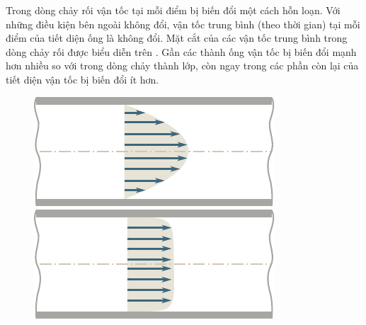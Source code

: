 Trong dòng chảy rối vận tốc tại mỗi điểm bị biến đổi một cách hỗn loạn. Với những điều kiện bên ngoài không đổi, vận tốc trung bình (theo thời gian) tại mỗi điểm của tiết diện ống là không đổi. Mặt cắt của các vận tốc trung bình trong dòng chảy rối được biểu diễn trên . Gần các thành ống vận tốc bị biến đổi mạnh hơn nhiều so với trong dòng chảy thành lớp, còn ngay trong các phần còn lại của tiết diện vận tốc bị biến đổi ít hơn.

\begin{figure}[!htb]
	\begin{minipage}[t]{0.5\linewidth}
		\begin{center}
			\includegraphics[scale=1.0]{figures/ch_09/fig_9_11.pdf}
			\caption[]{}
			\label{fig:9_11}
		\end{center}
	\end{minipage}
	\hspace{-0.0cm}
	\begin{minipage}[t]{0.5\linewidth}
		\begin{center}
			\includegraphics[scale=1.0]{figures/ch_09/fig_9_12.pdf}
			\caption[]{}
			\label{fig:9_12}
		\end{center}
	\end{minipage}
	\vspace{-0.4cm}
\end{figure}


